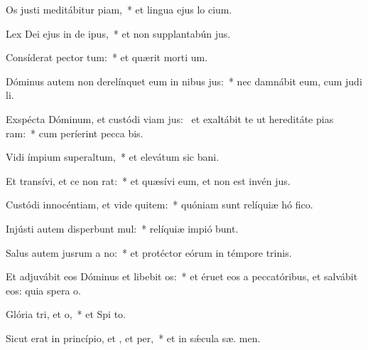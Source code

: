 \item Os justi meditábitur piam,~* et lingua ejus lo cium.
\item Lex Dei ejus in de ipus,~* et non supplantabún  jus.
\item Consíderat pector tum:~* et quærit morti um.
\item Dóminus autem non derelínquet eum in nibus jus:~* nec damnábit eum, cum judi li.
\item Exspécta Dóminum, et custódi viam jus:~\pscross{} et exaltábit te ut hereditáte pias ram:~* cum períerint pecca bis.
\item Vidi ímpium superaltum,~* et elevátum sic  bani.
\item Et transívi, et ce non rat:~* et quæsívi eum, et non est invén  jus.
\item Custódi innocéntiam, et vide quitem:~* quóniam sunt relíquiæ hó fico.
\item Injústi autem disperbunt mul:~* relíquiæ impió bunt.
\item Salus autem jusrum a no:~* et protéctor eórum in témpore trinis.
\item Et adjuvábit eos Dóminus et libebit os:~* et éruet eos a peccatóribus, et salvábit eos: quia spera  o.
\item Glória tri, et o,~* et Spi to.
\item Sicut erat in princípio, et , et per,~* et in sǽcula sæ. men.
